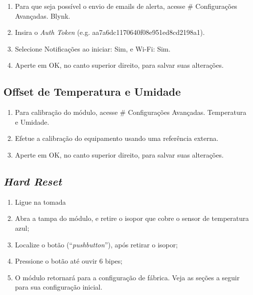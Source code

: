 \begin{enumerate}
    \item
    Para que seja possível o envio de emails de alerta, acesse \# \textrightarrow{} Configurações Avançadas.\textrightarrow{} Blynk.

    \item
    Insira o \emph{Auth Token} (e.g. aa7a6dc1170640f08e951ed8cd2198a1).

    \item
    Selecione Notificações ao iniciar: Sim, e Wi-Fi: Sim.

    \item
    Aperte em OK, no canto superior direito, para salvar suas alterações.
\end{enumerate}

\subsection{Offset de Temperatura e Umidade}

\begin{enumerate}
    \item
    Para calibração do módulo, acesse \# \textrightarrow{} Configurações Avançadas.\textrightarrow{} Temperatura e Umidade.

    \item
    Efetue a calibração do equipamento usando uma referência externa.

    \item
    Aperte em OK, no canto superior direito, para salvar suas alterações.
\end{enumerate}

\subsection{\emph{Hard Reset}}
\begin{enumerate}
	\item Ligue na tomada
	\item Abra a tampa do módulo, e retire o isopor que cobre o sensor de temperatura azul;
	\item Localize o botão (“\emph{pushbutton}”), após retirar o isopor;
	\item Pressione o botão até ouvir 6 bipes;
	\item O módulo retornará para a configuração de fábrica. Veja as seções a seguir para sua configuração inicial.
\end{enumerate}

